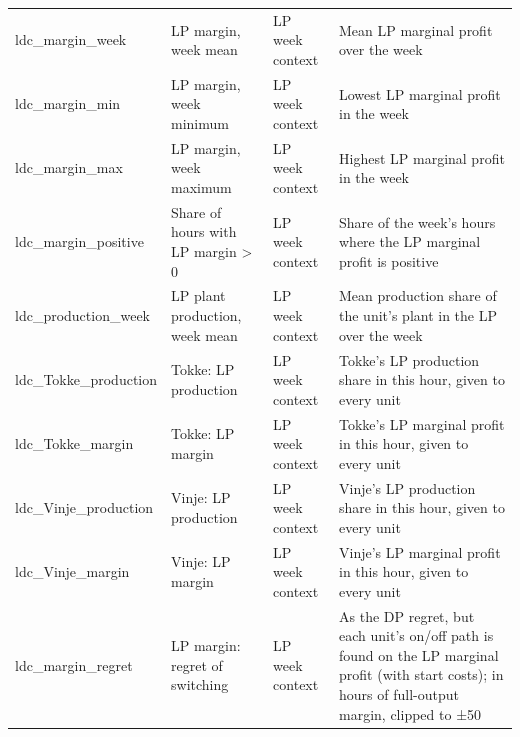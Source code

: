 \begin{longtable}{p{2.6cm}p{3.6cm}p{2.4cm}p{5.6cm}}
ldc\_\allowbreak{}margin\_\allowbreak{}week & LP margin, week mean & LP week context & Mean LP marginal profit over the week \\
ldc\_\allowbreak{}margin\_\allowbreak{}min & LP margin, week minimum & LP week context & Lowest LP marginal profit in the week \\
ldc\_\allowbreak{}margin\_\allowbreak{}max & LP margin, week maximum & LP week context & Highest LP marginal profit in the week \\
ldc\_\allowbreak{}margin\_\allowbreak{}positive & Share of hours with LP margin > 0 & LP week context & Share of the week's hours where the LP marginal profit is positive \\
ldc\_\allowbreak{}production\_\allowbreak{}week & LP plant production, week mean & LP week context & Mean production share of the unit's plant in the LP over the week \\
ldc\_\allowbreak{}Tokke\_\allowbreak{}production & Tokke: LP production & LP week context & Tokke's LP production share in this hour, given to every unit \\
ldc\_\allowbreak{}Tokke\_\allowbreak{}margin & Tokke: LP margin & LP week context & Tokke's LP marginal profit in this hour, given to every unit \\
ldc\_\allowbreak{}Vinje\_\allowbreak{}production & Vinje: LP production & LP week context & Vinje's LP production share in this hour, given to every unit \\
ldc\_\allowbreak{}Vinje\_\allowbreak{}margin & Vinje: LP margin & LP week context & Vinje's LP marginal profit in this hour, given to every unit \\
ldc\_\allowbreak{}margin\_\allowbreak{}regret & LP margin: regret of switching & LP week context & As the DP regret, but each unit's on/off path is found on the LP marginal profit (with start costs); in hours of full-output margin, clipped to ±50 \\
\bottomrule
\end{longtable}
